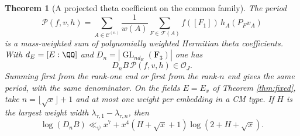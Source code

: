 \documentclass[a4paper,11pt]{article}
\newtheorem{theorem}[proposition]{Theorem}
\theoremstyle{definition}
\theoremstyle{remark}
\numberwithin{equation}{section}
\newcommand{\GL}{\operatorname{GL}}
\newcommand{\OO}{\mathcal O}
\begin{document}
\begin{theorem}[A projected theta coefficient on the common family]\label{thm:theta}
The period
\begin{equation}
 {\mathcal P}(f,v,h)=
   \sum_{A\in\mathcal C^{(n)}}\frac{1}{w(A)}
     \sum_{F\in\mathcal F(A)} f([F_1])\,h_A(P_Fv_A)
 \label{eq:period}
\end{equation}
is a mass-weighted sum of polynomially weighted Hermitian theta coefficients. With \(d_E=[E:\QQ]\) and \(D_n=|\GL_{nd_E}(\mathbf F_3)|\) one has
\[
              D_n B\,{\mathcal P}(f,v,h)\in\OO_J.
\]
Summing first from the rank-one end or first from the rank-\(n\) end gives the same period, with the same denominator. On the fields \(E=E_x\) of Theorem \ref{thm:fixed}, take \(n=\lfloor\sqrt x\rfloor+1\) and at most one weight per embedding in a CM type. If \(H\) is the largest weight width \(\lambda_{\tau,1}-\lambda_{\tau,n}\), then
\[
 \log(D_n B)\ll_\psi x^7+
     x^4(H+\sqrt x+1)\log(2+H+\sqrt x).
\]
\end{theorem}
\end{document}
